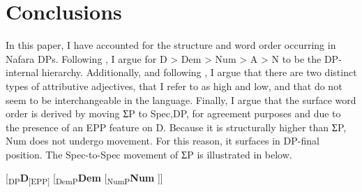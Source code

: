 \documentclass[output=paper]{langscibook}
\begin{document}
\section{Conclusions}
\label{sec:baron:3}
In this paper, I have accounted for the structure and word order occurring in Nafara DPs. Following \citet{Cinque2005}, I argue for D > Dem > Num > A > N to be the DP-internal hierarchy. Additionally, and following \citet{Cinque2010}, I argue that there are two distinct types of attributive adjectives, that I refer to as high and low, and that do not seem to be interchangeable in the language. Finally, I argue that the surface word order is derived by moving ƩP to Spec,DP, for agreement purposes and due to the presence of an EPP feature on D. Because it is structurally higher than ƩP, Num does not undergo movement. For this reason, it surfaces in DP-final position. The Spec-to-Spec movement of ƩP is illustrated in  below.

\ea\label{ex:baron:20}\small
[\textsubscript{DP}\textbf{D}\textsubscript{[EPP]} [\textsubscript{DemP}\textbf{Dem} [\textsubscript{NumP}\textbf{Num} ]]
\z
  








 

\end{document}
